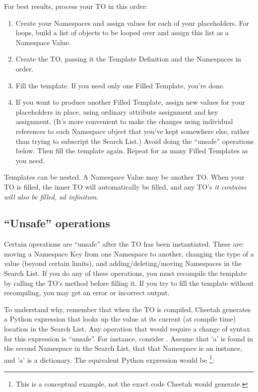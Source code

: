 For best results, process your TO in this order:

\begin{enumerate}

\item   Create your Namespaces and assign values for each of your placeholders.
     For  loops, build a list of objects to be looped over and
     assign this list as a Namespace Value.

\item   Create the TO, passing it the Template Definition and the Namespaces in
     order.

\item   Fill the template.  If you need only one Filled Template, you're done.

\item  If you want to produce another Filled Template, assign new values for
     your placeholders in place, using ordinary attribute assignment and key
     assignment.  (It's more convenient to make the changes using individual
     references to each Namespace object that you've kept somewhere else, 
     rather than trying to subscript the Search List.)  Avoid doing the
     ``unsafe'' operations below.  Then fill the template again.  Repeat for as
     many Filled Templates as you need.

\end{enumerate}

Templates can be nested.  A Namespace Value may be another TO.  When your TO
is filled, the inner TO will automatically be filled, and any TO's \em{it}
contains will also be filled, ad infinitum.


\subsection{``Unsafe'' operations}

Certain operations are ``unsafe'' after the TO has been instantiated.  These
are: moving a Namespace Key from one Namespace to another, changing the type of
a value (beyond certain limits), and adding/deleting/moving Namespaces in the
Search List. If you do any of these operations, you must recompile the template
by calling the TO's  method before filling it.  If you try
to fill the template without recompiling, you may get an error or incorrect
output.

To understand why, remember that when the TO is
compiled, Cheetah generates a Python expression that looks up the value at its
current (at compile time) location in the Search List.  Any operation that 
would require a change of syntax for this expression is ``unsafe''.  For
instance, consider .  Assume that 'a' is found in the second 
Namespace in the Search List, that that Namespace is an instance, and 'a' is
a dictionary.  The equivalent Python expression would be \footnote{This is a
conceptual example, not the exact code Cheetah would generate.}:

